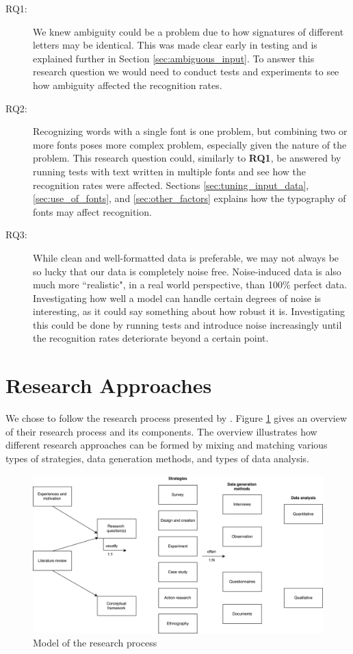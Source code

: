 \begin{description}
    \item[RQ1:]{We knew ambiguity could be a problem due to how signatures of different letters may be identical. This was made clear early in testing and is explained further in Section \ref{sec:ambiguous_input}. To answer this research question we would need to conduct tests and experiments to see how ambiguity affected the recognition rates.}
    \item[RQ2:]{Recognizing words with a single font is one problem, but combining two or more fonts poses more complex problem, especially given the nature of the problem. This research question could, similarly to \textbf{RQ1}, be answered by running tests with text written in multiple fonts and see how the recognition rates were affected. Sections \ref{sec:tuning_input_data}, \ref{sec:use_of_fonts}, and \ref{sec:other_factors} explains how the typography of fonts may affect recognition.}
    \item[RQ3:]{While clean and well-formatted data is preferable, we may not always be so lucky that our data is completely noise free. Noise-induced data is also much more ``realistic", in a real world perspective, than 100\% perfect data. Investigating how well a model can handle certain degrees of noise is interesting, as it could say something about how robust it is. Investigating this could be done by running tests and introduce noise increasingly until the recognition rates deteriorate beyond a certain point.}
\end{description}


\section{Research Approaches}
\label{sec:research_approaches}
We chose to follow the research process presented by \citep{oates2005researching}. Figure \ref{fig:model_research_process} gives an overview of their research process and its components. The overview illustrates how different research approaches can be formed by mixing and matching various types of strategies, data generation methods, and types of data analysis.

\begin{figure}[ht]
    \centering
    \includegraphics[width=1\textwidth]{fig/methodology/research_strategies.png}
    \caption{Model of the research process}
    \label{fig:model_research_process}
\end{figure}

